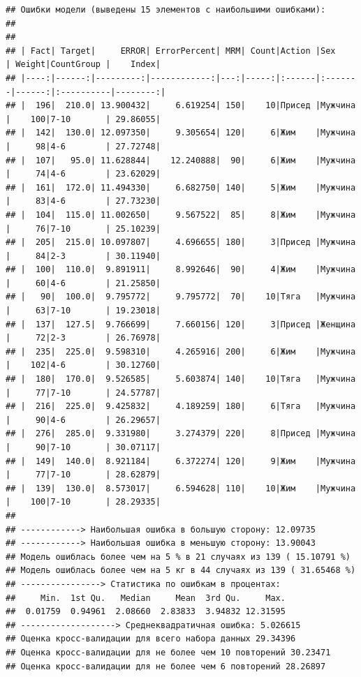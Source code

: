 \documentclass[
]{article}
\begin{document}
\begin{verbatim}
## Ошибки модели (выведены 15 элементов с наибольшими ошибками): 
## 
## 
## | Fact| Target|     ERROR| ErrorPercent| MRM| Count|Action |Sex     | Weight|CountGroup |    Index|
## |----:|------:|---------:|------------:|---:|-----:|:------|:-------|------:|:----------|--------:|
## |  196|  210.0| 13.900432|     6.619254| 150|    10|Присед |Мужчина |    100|7-10       | 29.86055|
## |  142|  130.0| 12.097350|     9.305654| 120|     6|Жим    |Мужчина |     98|4-6        | 27.72748|
## |  107|   95.0| 11.628844|    12.240888|  90|     6|Жим    |Мужчина |     74|4-6        | 23.62029|
## |  161|  172.0| 11.494330|     6.682750| 140|     5|Жим    |Мужчина |     83|4-6        | 27.73230|
## |  104|  115.0| 11.002650|     9.567522|  85|     8|Жим    |Мужчина |     76|7-10       | 25.10239|
## |  205|  215.0| 10.097807|     4.696655| 180|     3|Присед |Мужчина |     84|2-3        | 30.11940|
## |  100|  110.0|  9.891911|     8.992646|  90|     4|Жим    |Мужчина |     60|4-6        | 21.25850|
## |   90|  100.0|  9.795772|     9.795772|  70|    10|Тяга   |Мужчина |     63|7-10       | 19.23018|
## |  137|  127.5|  9.766699|     7.660156| 120|     3|Присед |Женщина |     72|2-3        | 26.76978|
## |  235|  225.0|  9.598310|     4.265916| 200|     6|Жим    |Мужчина |    102|4-6        | 30.12760|
## |  180|  170.0|  9.526585|     5.603874| 140|    10|Тяга   |Мужчина |     77|7-10       | 24.57787|
## |  216|  225.0|  9.425832|     4.189259| 180|     6|Тяга   |Мужчина |     90|4-6        | 26.29657|
## |  276|  285.0|  9.331980|     3.274379| 220|     8|Присед |Мужчина |     90|7-10       | 30.07117|
## |  149|  140.0|  8.921184|     6.372274| 120|     9|Жим    |Мужчина |     77|7-10       | 28.62879|
## |  139|  130.0|  8.573017|     6.594628| 110|    10|Жим    |Мужчина |    100|7-10       | 28.29335|
## 
## ------------> Наибольшая ошибка в большую сторону: 12.09735 
## ------------> Наибольшая ошибка в меньшую сторону: 13.90043 
## Модель ошиблась более чем на 5 % в 21 случаях из 139 ( 15.10791 %)
## Модель ошиблась более чем на 5 кг в 44 случаях из 139 ( 31.65468 %)
## ----------------> Статистика по ошибкам в процентах:
##     Min.  1st Qu.   Median     Mean  3rd Qu.     Max. 
##  0.01759  0.94961  2.08660  2.83833  3.94832 12.31595 
## -------------------> Среднеквадратичная ошибка: 5.026615 
## Оценка кросс-валидации для всего набора данных 29.34396 
## Оценка кросс-валидации для не более чем 10 повторений 30.23471 
## Оценка кросс-валидации для не более чем 6 повторений 28.26897
\end{verbatim}
\end{document}
